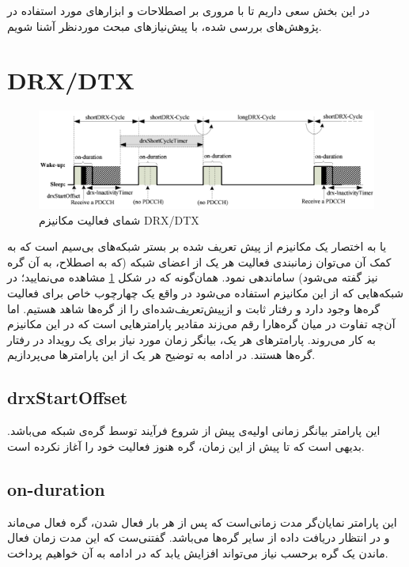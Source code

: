 در این بخش سعی داریم تا با مروری بر اصطلاحات و ابزارهای مورد استفاده در پژوهش‌های بررسی شده، با پیش‌نیازهای مبحث موردنظر آشنا شویم. 

\section{DRX/DTX}

\begin{figure}
	\centering
	\includegraphics[width=\linewidth]{figs/drx}
	\caption {شمای فعالیت مکانیزم DRX/DTX}
	\label{fig:drx}
\end{figure}

یا به اختصار 
یک مکانیزم از پیش تعریف شده بر بستر شبکه‌های بی‌سیم است که به کمک آن می‌توان زمانبندی فعالیت هر یک از اعضای شبکه (که به اصطلاح، به آن گره نیز گفته می‌شود) ساماندهی نمود. همان‌گونه که در شکل \ref{fig:drx} مشاهده می‌نمایید؛ در شبکه‌هایی که از این مکانیزم استفاده می‌شود در واقع یک چهارچوب خاص برای فعالیت گره‌ها وجود دارد و رفتار ثابت و ازپیش‌تعریف‌شده‌ای را از گره‌ها شاهد هستیم. اما آن‌چه تفاوت در میان گره‌هارا رقم می‌زند مقادیر پارامترهایی است که در این مکانیزم به کار می‌روند. پارامتر‌های  هر یک، بیانگر زمان مورد نیاز برای یک رویداد در رفتار گره‌ها هستند. در ادامه به توضیح هر یک از این پارامتر‌ها می‌پردازیم.

\subsection{drxStartOffset}
این پارامتر بیانگر  زمانی اولیه‌ی پیش از شروع فرآیند توسط گره‌ی شبکه می‌باشد. بدیهی است که تا پیش از این زمان، گره هنوز فعالیت خود را آغاز نکرده است.

\subsection{on-duration}
این پارامتر نمایان‌گر مدت زمانی‌است که پس از هر بار فعال شدن، گره فعال می‌ماند و در انتظار دریافت داده از سایر گره‌ها می‌باشد. گفتنی‌ست که این مدت زمان فعال ماندن یک گره برحسب نیاز می‌تواند افزایش یابد که در ادامه به آن خواهیم پرداخت.

